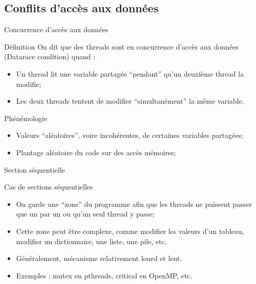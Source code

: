 \documentclass[handout,francais]{beamer}
\begin{document}
\subsection{Conflits d'accès aux données}

\begin{frame}[fragile]{Concurrence d'accès aux données}
 \begin{block}{Définition}
  On dit que des threads sont en concurrence d'accès aux données
  (Datarace condition) quand :
  \begin{itemize}
   \item Un thread lit une variable partagée ``pendant'' qu'un deuxième thread la modifie;
   \item Les deux threads tentent de modifier ``simultanément'' la même variable.
  \end{itemize}
 \end{block}

 \begin{block}{Phénémologie}
  \begin{itemize}
   \item Valeurs ``aléatoires'', voire incohérentes, de certaines variables partagées;
   \item Plantage aléatoire du code sur des accès mémoires;
  \end{itemize}

 \end{block}

\end{frame}

\begin{frame}[fragile]{Section séquentielle}

\begin{block}{Cas de sections séquentielles}
 \begin{itemize}
  \item On garde une ``zone'' du programme afin que les threads ne puissent passer
  que un par un ou qu'un seul thread y passe;
  \item Cette zone peut être complexe, comme modifier les valeurs d'un tableau, modifier un
  dictionnaire, une liste, une pile, etc.
  \item Généralement, mécanisme relativement lourd et lent.
  \item Exemples : mutex en pthreads, critical en OpenMP, etc.
 \end{itemize}

\end{block}

\end{frame}
\end{document}
